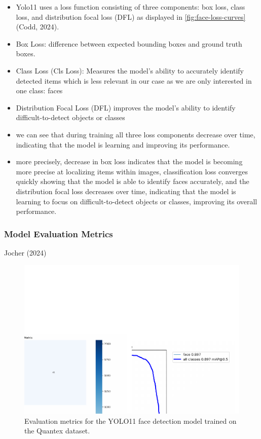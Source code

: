 \documentclass[
  man,floatsintext]{apa6}
\begin{document}
\begin{itemize}
\item
  Yolo11 uses a loss function consisting of three components: box loss, class loss, and distribution focal loss (DFL) as displayed in \ref{fig:face-loss-curves} (Codd, 2024).
\item
  Box Loss: difference between expected bounding boxes and ground truth boxes.
\item
  Class Loss (Cls Loss): Measures the model's ability to accurately identify detected items which is less relevant in our case as we are only interested in one class: faces
\item
  Distribution Focal Loss (DFL) improves the model's ability to identify difficult-to-detect objects or classes
\item
  we can see that during training all three loss components decrease over time, indicating that the model is learning and improving its performance.
\item
  more precisely, decrease in box loss indicates that the model is becoming more precise at localizing items within images, classification loss converges quickly showing that the model is able to identify faces accurately, and the distribution focal loss decreases over time, indicating that the model is learning to focus on difficult-to-detect objects or classes, improving its overall performance.
\end{itemize}

\subsubsection{Model Evaluation Metrics}\label{model-evaluation-metrics}

Jocher (2024)

\begin{figure}

{\centering \includegraphics{Quantex_interaction_paper_files/figure-latex/face-metrics-1} 

}

\caption{Evaluation metrics for the YOLO11 face detection model trained on the Quantex dataset.}\label{fig:face-metrics}
\end{figure}
\end{document}
